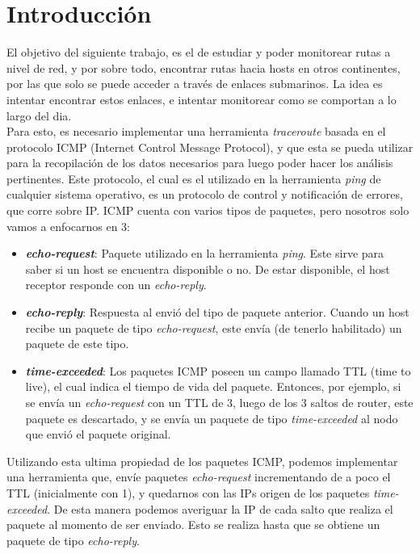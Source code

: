 \section{Introducción}

El objetivo del siguiente trabajo, es el de estudiar y poder monitorear rutas a nivel de red, y por sobre todo, encontrar rutas hacia hosts en otros continentes, por las que solo se puede acceder a través de enlaces submarinos. La idea es intentar encontrar estos enlaces, e intentar monitorear como se comportan a lo largo del dia. \\

Para esto, es necesario implementar una herramienta \textit{traceroute} basada en el protocolo ICMP (Internet Control Message Protocol), y que esta se pueda utilizar para la recopilación de los datos necesarios para luego poder hacer los análisis pertinentes. Este protocolo, el cual es el utilizado en la herramienta \textit{ping} de cualquier sistema operativo, es un protocolo de control y notificación de errores, que corre sobre IP. ICMP cuenta con varios tipos de paquetes, pero nosotros solo vamos a enfocarnos en 3:

\begin{itemize}
	\item \textit{\textbf{echo-request}}: Paquete utilizado en la herramienta \textit{ping}. Este sirve para saber si un host se encuentra disponible o no. De estar disponible, el host receptor responde con un \textit{echo-reply}.
	\item \textit{\textbf{echo-reply}}: Respuesta al envió del tipo de paquete anterior. Cuando un host recibe un paquete de tipo \textit{echo-request}, este envía (de tenerlo habilitado) un paquete de este tipo.
	\item \textit{\textbf{time-exceeded}}: Los paquetes ICMP poseen un campo llamado TTL (time to live), el cual indica el tiempo de vida del paquete. Entonces, por ejemplo, si se envía un \textit{echo-request} con un TTL de 3, luego de los 3 saltos de router, este paquete es descartado, y se envía un paquete de tipo \textit{time-exceeded} al nodo que envió el paquete original.
\end{itemize}

Utilizando esta ultima propiedad de los paquetes ICMP, podemos implementar una herramienta que, envíe paquetes \textit{echo-request} incrementando de a poco el TTL (inicialmente con 1), y quedarnos con las IPs origen de los paquetes \textit{time-exceeded}. De esta manera podemos averiguar la IP de cada salto que realiza el paquete al momento de ser enviado. Esto se realiza hasta que se obtiene un paquete de tipo \textit{echo-reply}.\\

